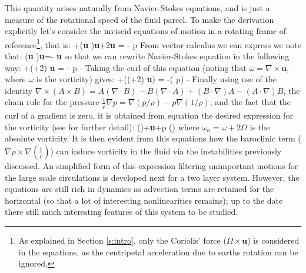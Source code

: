 This quantity arises naturally from Navier-Stokes equations, and is just
a measure of the rotational speed of the fluid parcel. To make the
derivation explicitly let's consider the inviscid equations of motion in
a rotating frame of reference\footnote{As explained in Section
\ref{s:intro}, only the Coriolis' force ($\Omega \times \textbf{u}$) is
considered in the equations, as the centripetal acceleration due to
earths rotation can be ignored.}, that is:
\beq
{}+(\textbf{u} \cdot \nabla)\textbf{u}+2\Omega \times \textbf{u} = - \nabla p
From vector calculus we can express we note that:
\beq
(\textbf{u} \cdot \nabla)\textbf{u}=- \textbf{u} \times \omega
{}
so that we can rewrite Navier-Stokes equation in the following way:
\beq
{}+(\omega+2\Omega) \times \textbf{u} = - \nabla p -
Taking the curl of this equation (noting that $\omega = \nabla \times
\textbf{u}$, where $\omega$ is the vorticity) gives:
\beq
{}+\nabla (\times(\omega+2\Omega) \times \textbf{u}) = -\nabla \times\left( \nabla p\right) -\nabla \times {}
Finally using use of the identity $\nabla \times (A \times B) = A (\nabla
\cdot B)-B (\nabla \cdot A)+(B \cdot \nabla)A-(A \cdot \nabla)B$, the
chain rule for the pressure $\frac{1}{\rho} \nabla p = \nabla (p/\rho)-p
\nabla (1/\rho)$, and the fact that the curl of a gradient is zero, it is
obtained from equation  the desired expression for the
vorticity (see  for further detail):
\beq
{}\left(\right)+ \textbf{u}+\nabla p \times \nabla \left(\right)
\ee
where $\omega_a=\omega+2\Omega$ is the absolute vorticity. It is then
evident from this equations how the baroclinic term ($\nabla p \times
\nabla \left(\frac{1}{\rho}\right)$) can induce vorticity in the fluid
via the instabilities previously discussed. An simplified form of this
expression filtering unimportant motions for the large scale circulations
is developed next for a two layer system. However, the equations are
still rich in dynamics as advection terms are retained for the horizontal
(so that a lot of interesting nonlinearities remains); up to the date
there still much interesting features of this system to be studied.




